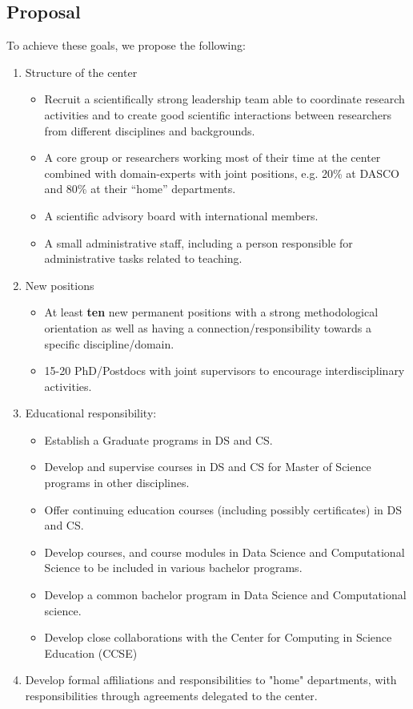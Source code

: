 \documentclass[a4paper,10pt]{article}
\begin{document}
\subsection{Proposal}
To achieve these goals, we propose the following:
\begin{enumerate}
\item Structure of the center
\begin{itemize}
\item Recruit a  scientifically strong leadership team able to coordinate research activities and to create good scientific interactions between researchers from different disciplines and backgrounds. 
\item A core group or researchers working most of their time at the center combined with domain-experts with joint positions, e.g. 20\% at DASCO and 80\% at their ``home'' departments.
\item A scientific advisory board with international members.
\item A small administrative staff, including a person responsible for administrative tasks related to teaching.
\end{itemize}
\item New positions
\begin{itemize}
\item At least {\bf ten} new permanent positions with a strong methodological orientation as well as  having a connection/responsibility towards a specific discipline/domain.
\item 15-20 PhD/Postdocs with joint supervisors to encourage interdisciplinary activities.
\end{itemize}
\item Educational responsibility:
\begin{itemize}
\item Establish a Graduate programs in DS and CS.
\item Develop and supervise courses in DS and CS for Master of Science programs in other disciplines.
\item Offer continuing education courses (including possibly certificates) in DS and CS.
\item Develop courses, and course modules in Data Science and Computational Science to be included in various bachelor programs. 
\item Develop a common bachelor program  in Data Science and Computational science.
\item Develop close collaborations with the Center for Computing in Science Education (CCSE) 
\end{itemize}
\item Develop formal affiliations and responsibilities to "home" departments, with  responsibilities through agreements delegated to the center. 
\end{enumerate}
\end{document}
